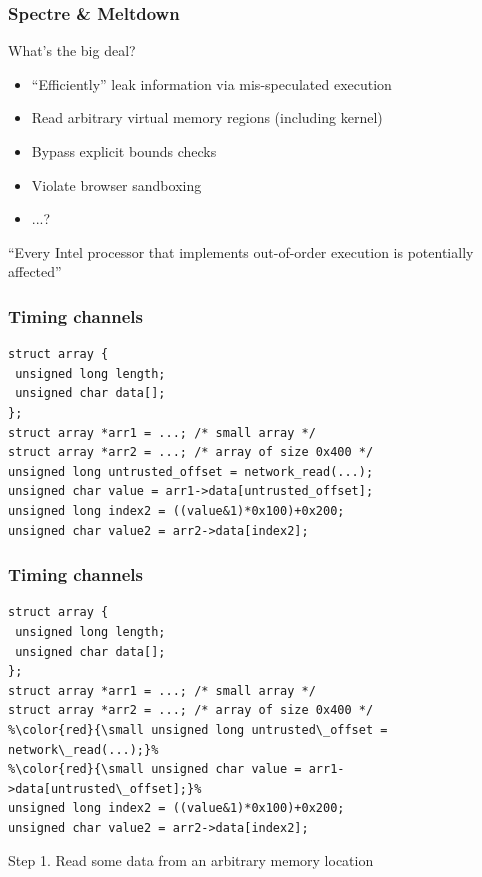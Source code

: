 \documentclass[10pt,handout]{beamer}
\begin{document}

\begin{frame}

\frametitle{Spectre \& Meltdown}

What's the big deal? \pause
\begin{itemize}
\item ``Efficiently'' leak information via mis-speculated execution
\item Read arbitrary virtual memory regions (including kernel)
\item Bypass explicit bounds checks
\item Violate browser sandboxing
\item ...? \\[1em]
\end{itemize}

\pause
\begin{center}
``Every Intel processor that implements out-of-order execution is potentially affected''
\end{center}

\end{frame}


\begin{frame}[fragile]

\frametitle{Timing channels}

\begin{lstlisting}[basicstyle=\small,style=customjava]
struct array {
 unsigned long length;
 unsigned char data[];
};
struct array *arr1 = ...; /* small array */
struct array *arr2 = ...; /* array of size 0x400 */
unsigned long untrusted_offset = network_read(...);
unsigned char value = arr1->data[untrusted_offset];
unsigned long index2 = ((value&1)*0x100)+0x200;
unsigned char value2 = arr2->data[index2];
\end{lstlisting}

\end{frame}


\begin{frame}[fragile]

\frametitle{Timing channels}

\begin{lstlisting}[basicstyle=\small,style=customjava]
struct array {
 unsigned long length;
 unsigned char data[];
};
struct array *arr1 = ...; /* small array */
struct array *arr2 = ...; /* array of size 0x400 */
%\color{red}{\small unsigned long untrusted\_offset = network\_read(...);}%
%\color{red}{\small unsigned char value = arr1->data[untrusted\_offset];}%
unsigned long index2 = ((value&1)*0x100)+0x200;
unsigned char value2 = arr2->data[index2];
\end{lstlisting}

\begin{center}
Step 1. Read some data from an arbitrary memory location
\end{center}

\end{frame}
\end{document}
